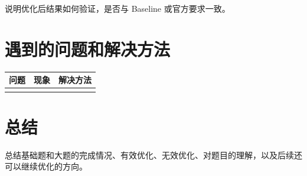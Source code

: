 \documentclass[UTF8]{ctexart}
\begin{document}
说明优化后结果如何验证，是否与 Baseline 或官方要求一致。

\section{遇到的问题和解决方法}

\begin{tabular}{lll}
\toprule
问题 & 现象 & 解决方法 \\
\midrule
 &  &  \\
\bottomrule
\end{tabular}

\section{总结}

总结基础题和大题的完成情况、有效优化、无效优化、对题目的理解，以及后续还可以继续优化的方向。
\end{document}
